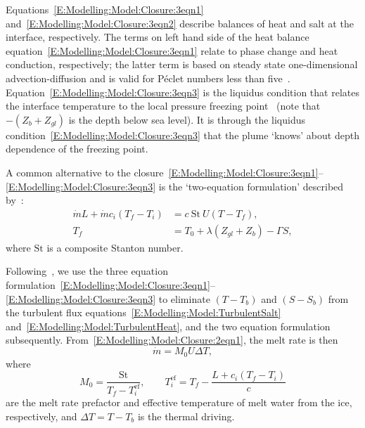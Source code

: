\documentclass{jfm}
\begin{document}
Equations~\eqref{E:Modelling:Model:Closure:3eqn1} and~\eqref{E:Modelling:Model:Closure:3eqn2} describe balances of heat and salt at the interface, respectively. The terms on left hand side of the heat balance equation~\eqref{E:Modelling:Model:Closure:3eqn1} relate to phase change and heat conduction, respectively; the latter term is based on steady state one-dimensional advection-diffusion and is valid for P\'{e}clet numbers less than five~\citep{Holland1999JPhysOcean}. Equation~\eqref{E:Modelling:Model:Closure:3eqn3} is the liquidus condition that relates the interface temperature to the local pressure freezing point~\citep{Holland1999JPhysOcean} (note that $-(Z_b + Z_{gl})$ is the depth below sea level). It is through the liquidus condition~\eqref{E:Modelling:Model:Closure:3eqn3} that the plume `knows' about depth dependence of the freezing point.

A common alternative to the closure~\eqref{E:Modelling:Model:Closure:3eqn1}--\eqref{E:Modelling:Model:Closure:3eqn3} is the `two-equation formulation' described by~\citet{McPhee1992JGeophysResOcean}:
\begin{align}
\dot{m}L + \dot{m}c_i (T_f - T_i) &= c~ \mathrm{St} ~U(T - T_f),\label{E:Modelling:Model:Closure:2eqn1}\\
T_f &= T_0 + \lambda (Z_{gl} + Z_b) - \Gamma S,\label{E:Modelling:Model:Closure:2eqn2}
\end{align}
where $\mathrm{St}$ is a composite Stanton number.

Following~\cite{Jenkins2011JPhysOcean}, we use the three equation formulation~\eqref{E:Modelling:Model:Closure:3eqn1}--\eqref{E:Modelling:Model:Closure:3eqn3} to eliminate $(T-T_b)$ and $(S-S_b)$ from the turbulent flux equations~\eqref{E:Modelling:Model:TurbulentSalt} and~\eqref{E:Modelling:Model:TurbulentHeat}, and the two equation formulation subsequently. From~\eqref{E:Modelling:Model:Closure:2eqn1}, the melt rate is then
\begin{equation}\label{E:Modelling:Model:Closure:mdot}
\dot{m} = M_0 U \Delta T,  
\end{equation}
where 
\begin{equation}
M_0 = \frac{\mathrm{St}}{T_f - T_i^{\text{ef}}}, \qquad T_i^{\text{ef}} = T_f - \frac{L + c_i(T_f - T_i)}{c}
\end{equation}
are the melt rate prefactor and effective temperature of melt water from the ice, respectively, and $\Delta T = T - T_b$ is the thermal driving. 
\end{document}
